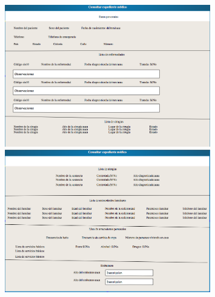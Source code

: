 \begin{figure}[htbp!]
        \centering
            \includegraphics[width=0.8\textwidth]{images/UIEXP1}
            \includegraphics[width=0.8\textwidth]{images/UIEXP2}
            
    \end{figure}
